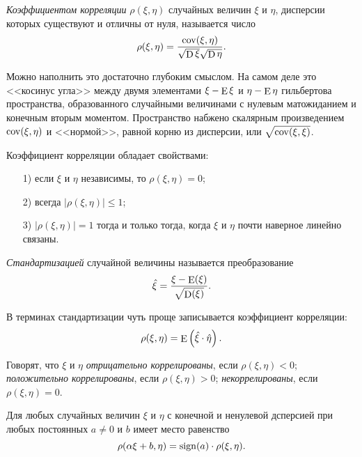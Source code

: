 \begin{to_def}
    \textit{Коэффициентом корреляции} $\rho (\xi, \eta)$ случайных величин $\xi$ и $\eta$, дисперсии которых существуют и отличны от нуля, называется число
    \begin{equation}
        \rho (\xi, \eta) = 
        \frac{\mathop{\mathrm{cov}}\nolimits (\xi, \eta)}{\sqrt{\mathop{\mathrm{D}}\nolimits \xi} \sqrt{\mathop{\mathrm{D}}\nolimits \eta}}.
    \end{equation}
\end{to_def}

Можно наполнить это достаточно глубоким смыслом. На самом деле это <<косинус угла>> между двумя элементами $\xi - \mathop{\mathrm{E}}\nolimits \xi$ и $\eta - \mathop{\mathrm{E}}\nolimits \eta$ гильбертова пространства, образованного случайными величинами с нулевым матожиданием и конечным вторым моментом. Пространство набжено скалярным произведением $\mathop{\mathrm{cov}}\nolimits (\xi, \eta)$ и <<нормой>>, равной корню из дисперсии, или $\sqrt{ \mathop{\mathrm{cov}}\nolimits (\xi, \xi)}$.

\begin{to_thr}[]
    Коэффициент корреляции обладает свойствами:
    \begin{itemize}
        \item[1)] если $\xi$ и $\eta$ независимы, то $\rho(\xi, \eta) = 0$;
        \item[2)] всегда $|\rho(\xi, \eta)| \leq 1$;
        \item[3)] $|\rho(\xi, \eta)|=1$ тогда и только тогда, когда $\xi$ и $\eta$ почти наверное линейно связаны. 
    \end{itemize}
\end{to_thr}

\begin{to_def}
    \textit{Стандартизацией} случайной величины называется преобразование
    \begin{equation}
        \hat{\xi} = \frac{\xi - \mathop{\mathrm{E}}\nolimits(\xi)}{\sqrt{\mathop{\mathrm{D}}\nolimits (\xi)}}.
    \end{equation}
\end{to_def}

В терминах стандартизации чуть проще записывается коэффициент корреляции:
\begin{equation*}
    \rho (\xi, \eta) = \mathop{\mathrm{E}}\nolimits \left(
        \hat{\xi} \cdot \hat{\eta}
    \right).
\end{equation*}

\begin{to_def}
    Говорят, что $\xi$ и $\eta$ \textit{отрицательно коррелированы}, если $\rho(\xi, \eta) < 0$; \textit{положительно коррелированы}, если $\rho (\xi, \eta) > 0$; \textit{некоррелированы}, если $\rho(\xi, \eta) = 0$. 
\end{to_def}

\begin{to_lem}
    Для любых случайных величин $\xi$ и $\eta$ с конечной и ненулевой дсперсией при любых постоянных $a \neq 0$ и $b$ имеет место равенство
    \begin{equation}
        \rho (\alpha \xi + b, \eta) = \mathop{\mathrm{sign}}\nolimits(a) \cdot \rho (\xi, \eta).
    \end{equation}
\end{to_lem}


\noindent
{}